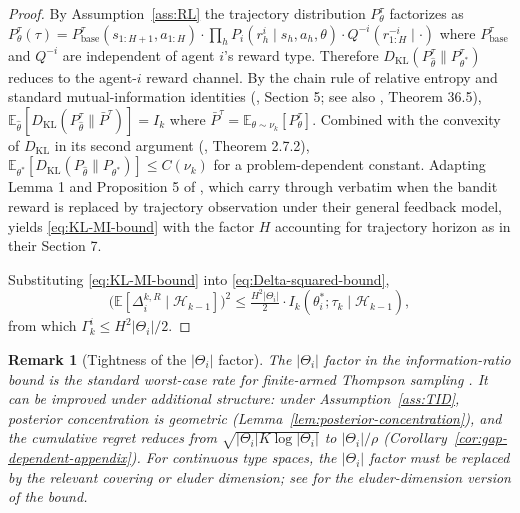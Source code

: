 \documentclass{article}
\newtheorem{remark}[theorem]{Remark}
\begin{document}
\begin{proof}
By Assumption~\ref{ass:RL} the trajectory distribution $P_\theta^\tau$ factorizes as $P_\theta^\tau(\tau) = P_{\mathrm{base}}^\tau(s_{1:H+1}, a_{1:H}) \cdot \prod_h P_i(r_h^i \mid s_h, a_h, \theta) \cdot Q^{-i}(r^{-i}_{1:H} \mid \cdot)$ where $P_{\mathrm{base}}^\tau$ and $Q^{-i}$ are independent of agent $i$'s reward type. Therefore $D_{\mathrm{KL}}(P_{\hat{\theta}}^\tau \| P_{\theta^*}^\tau)$ reduces to the agent-$i$ reward channel. By the chain rule of relative entropy and standard mutual-information identities (\citealp{russo2016information}, Section 5; see also \citealp{lattimore2020bandit}, Theorem 36.5), $\mathbb{E}_{\hat{\theta}}[D_{\mathrm{KL}}(P_{\hat{\theta}}^\tau \| \bar{P}^\tau)] = I_k$ where $\bar{P}^\tau = \mathbb{E}_{\theta \sim \nu_k}[P_\theta^\tau]$. Combined with the convexity of $D_{\mathrm{KL}}$ in its second argument (\citealp{cover2006elements}, Theorem 2.7.2), $\mathbb{E}_{\theta^*}[D_{\mathrm{KL}}(P_{\hat{\theta}} \| P_{\theta^*})] \leq C(\nu_k)$ for a problem-dependent constant. Adapting Lemma 1 and Proposition 5 of \citet{russo2016information}, which carry through verbatim when the bandit reward is replaced by trajectory observation under their general feedback model, yields \eqref{eq:KL-MI-bound} with the factor $H$ accounting for trajectory horizon as in their Section 7.

Substituting \eqref{eq:KL-MI-bound} into \eqref{eq:Delta-squared-bound},
\begin{equation}
\big(\mathbb{E}[\Delta_i^{k,R} \mid \mathcal{H}_{k-1}]\big)^2 \leq \tfrac{H^2 |\Theta_i|}{2} \cdot I_k(\theta_i^*; \tau_k \mid \mathcal{H}_{k-1}),
\end{equation}
from which $\Gamma_k^i \leq H^2 |\Theta_i|/2$.
\end{proof}

\begin{remark}[Tightness of the $|\Theta_i|$ factor]
\label{rem:info-ratio-tight}
The $|\Theta_i|$ factor in the information-ratio bound is the standard worst-case rate for finite-armed Thompson sampling \citep{russo2016information}. It can be improved under additional structure: under Assumption~\ref{ass:TID}, posterior concentration is geometric (Lemma~\ref{lem:posterior-concentration}), and the cumulative regret reduces from $\sqrt{|\Theta_i| K \log|\Theta_i|}$ to $|\Theta_i|/\rho$ (Corollary~\ref{cor:gap-dependent-appendix}). For continuous type spaces, the $|\Theta_i|$ factor must be replaced by the relevant covering or eluder dimension; see \citet{russo2014learning} for the eluder-dimension version of the bound.
\end{remark}
\end{document}
